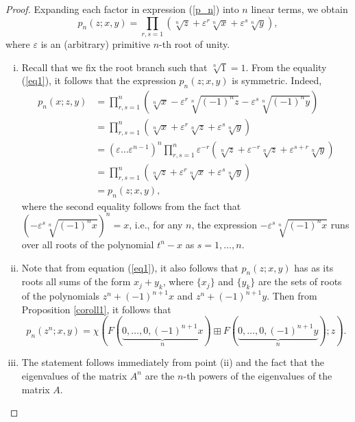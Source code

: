 \documentclass[10pt,a4paper]{amsart}
\renewcommand{\epsilon}{\varepsilon}
\begin{document}
\begin{proof}
Expanding each factor in expression (\ref{p_n}) into $n$ linear terms, we obtain
\begin{equation}\label{eq1}
p_n(z; x, y) = \prod\limits_{r, s = 1}(\sqrt[n]{z} + \epsilon^r\sqrt[n]{x} + \epsilon^s\sqrt[n]{y}),
\end{equation}
where $\varepsilon$ is an (arbitrary) primitive $n$-th root of unity.

\begin{enumerate}[(i)]

\item Recall that we fix the root branch such that $\sqrt[n]{1} = 1$. From the equality (\ref{eq1}), it follows that the expression $p_n(z; x, y)$ is symmetric. Indeed,
\begin{align*}
p_n(x; z, y) &= \prod\limits_{r,s = 1}^n (\sqrt[n]{x} - \epsilon^r\sqrt[n]{(-1)^nz} - \epsilon^s\sqrt[n]{(-1)^ny}) \\
&= \prod\limits_{r,s = 1}^n (\sqrt[n]{x} + \epsilon^r\sqrt[n]{z} + \epsilon^s\sqrt[n]{y}) \\
&= \left(\epsilon \dots \epsilon^{n-1} \right)^n\prod\limits_{r, s =1}^n \epsilon^{-r}(\sqrt[n]{z} + \epsilon^{-r}\sqrt[n]{z} + \epsilon^{s+r}\sqrt[n]{y})\\
&= \prod\limits_{r,s = 1}^n (\sqrt[n]{z} + \epsilon^r\sqrt[n]{x} + \epsilon^s\sqrt[n]{y}) \\
&= p_n(z; x, y),
\end{align*}
where the second equality follows from the fact that $(-\epsilon^s\sqrt[n]{(-1)^nx})^n = x$, i.e., for any $n$, the expression $-\epsilon^s\sqrt[n]{(-1)^nx}$ runs over all roots of the polynomial $t^n - x$ as $s = 1, \dots, n$.

\item Note that from equation (\ref{eq1}), it also follows that $p_n(z; x, y)$ has as its roots all sums of the form $x_j + y_k$, where $\{x_j\}$ and $\{y_k\}$ are the sets of roots of the polynomials $z^n + (-1)^{n+1}x$ and $z^n + (-1)^{n+1}y$. Then from Proposition \ref{coroll1}, it follows that
$$p_n(z^n; x, y) =  \chi(F(\underset{n}{\underbrace{0,\dots,0,(-1)^{n+1}x}})\boxplus F(\underset{n}{\underbrace{0,\dots,0,(-1)^{n+1}y}}); z).$$

\item The statement follows immediately from point (ii) and the fact that the eigenvalues of the matrix $A^n$ are the $n$-th powers of the eigenvalues of the matrix $A$.
\end{enumerate}
\end{proof}
\end{document}
